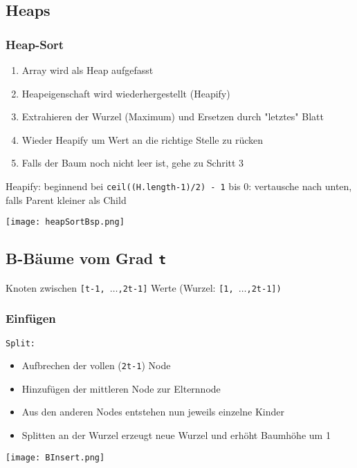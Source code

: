 \subsection*{Heaps}
\subsubsection*{Heap-Sort}
    \begin{enumerate}
        \item Array wird als Heap aufgefasst
        \item Heapeigenschaft wird wiederhergestellt (Heapify)
        \item Extrahieren der Wurzel (Maximum) und Ersetzen durch \string"letztes\string" Blatt
        \item Wieder Heapify um Wert an die richtige Stelle zu rücken
        \item Falls der Baum noch nicht leer ist, gehe zu Schritt 3
    \end{enumerate}

\noindent
Heapify: beginnend bei \texttt{ceil((H.length-1)/2) - 1} bis 0: vertausche nach unten, falls Parent kleiner als Child
\centerline{\texttt{[image: heapSortBsp.png]}}

\subsection*{B-Bäume vom Grad \texttt{t}}
\centerline{Knoten zwischen \texttt{[t-1, $\dots$,2t-1]} Werte (Wurzel: \texttt{[1, $\dots$,2t-1])}} 
\subsubsection*{Einfügen}
\texttt{Split:}
    \begin{itemize}
        \item Aufbrechen der vollen (\texttt{2t-1}) Node
        \item Hinzufügen der mittleren Node zur Elternnode
        \item Aus den anderen Nodes entstehen nun jeweils einzelne Kinder
        \item Splitten an der Wurzel erzeugt neue Wurzel und erhöht Baumhöhe um 1
    \end{itemize}

\centerline{\texttt{[image: BInsert.png]}}

